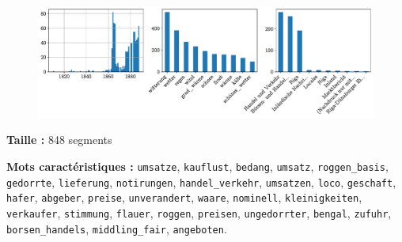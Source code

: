\documentclass[a4paper,twoside,12pt]{article}
\begin{document}
\begin{figure}[H]
\centering
\includegraphics[width=\textwidth]{images/topic_charts_4.pdf}
\end{figure}

\begin{flushleft}
\textbf{Taille :} 848 segments

\textbf{Mots caractéristiques :} \texttt{umsatze}, \texttt{kauflust}, \texttt{bedang}, \texttt{umsatz}, \texttt{roggen\_basis}, \texttt{gedorrte}, \texttt{lieferung}, \texttt{notirungen}, \texttt{handel\_verkehr}, \texttt{umsatzen}, \texttt{loco}, \texttt{geschaft}, \texttt{hafer}, \texttt{abgeber}, \texttt{preise}, \texttt{unverandert}, \texttt{waare}, \texttt{nominell}, \texttt{kleinigkeiten}, \texttt{verkaufer}, \texttt{stimmung}, \texttt{flauer}, \texttt{roggen}, \texttt{preisen}, \texttt{ungedorrter}, \texttt{bengal}, \texttt{zufuhr}, \texttt{borsen\_handels}, \texttt{middling\_fair}, \texttt{angeboten}.
\end{flushleft}

\medskip
\end{document}
